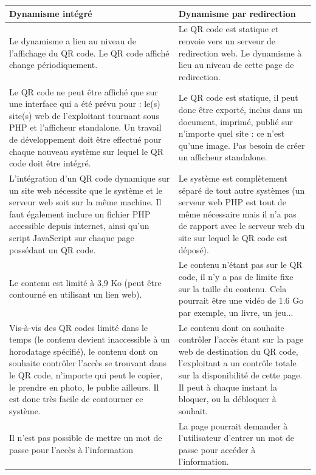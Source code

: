 \documentclass[a4paper,12pt]{article}
\begin{document}
    \noindent\begin{longtable}{ | m{} | m{} | } 
    \hline
    \textbf{Dynamisme intégré} & \textbf{Dynamisme par redirection} \\ 
    \hline
    Le dynamisme a lieu au niveau de l’affichage du QR code. Le QR code affiché change périodiquement. & Le QR code est statique et renvoie vers un serveur de redirection web. Le dynamisme à lieu au niveau de cette page de redirection.\\
    \hline
    Le QR code ne peut être affiché que sur une interface qui a été prévu pour : le(s) site(s) web de l'exploitant tournant sous PHP et l'afficheur standalone. Un travail de développement doit être effectué pour chaque nouveau système sur lequel le QR code doit être intégré. & Le QR code est statique, il peut donc être exporté, inclus dans un document, imprimé, publié sur n'importe quel site : ce n'est qu'une image. Pas besoin de créer un afficheur standalone.\\
    \hline
    L'intégration d'un QR code dynamique sur un site web nécessite que le système et le serveur web soit sur la même machine. Il faut également inclure un fichier PHP accessible depuis internet, ainsi qu'un script JavaScript sur chaque page possédant un QR code. & Le système est complètement séparé de tout autre systèmes (un serveur web PHP est tout de même nécessaire mais il n'a pas de rapport avec le serveur web du site sur lequel le QR code est déposé).\\
    \hline
    Le contenu est limité à 3,9 Ko (peut être contourné en utilisant un lien web). & Le contenu n'étant pas sur le QR code, il n'y a pas de limite fixe sur la taille du contenu. Cela pourrait être une vidéo de 1.6 Go par exemple, un livre, un jeu...\\
    \hline
    Vis-à-vis des QR codes limité dans le temps (le contenu devient inaccessible à un horodatage spécifié), le contenu dont on souhaite contrôler l'accès se trouvant dans le QR code, n'importe qui peut le copier, le prendre en photo, le publie ailleurs. Il est donc très facile de contourner ce système. & Le contenu dont on souhaite contrôler l'accès étant sur la page web de destination du QR code, l'exploitant a un contrôle totale sur la disponibilité de cette page. Il peut à chaque instant la bloquer, ou la débloquer à souhait.\\
    \hline
    Il n'est pas possible de mettre un mot de passe pour l'accès à l'information & La page pourrait demander à l'utilisateur d'entrer un mot de passe pour accéder à l'information.\\

\end{longtable}
\end{document}
